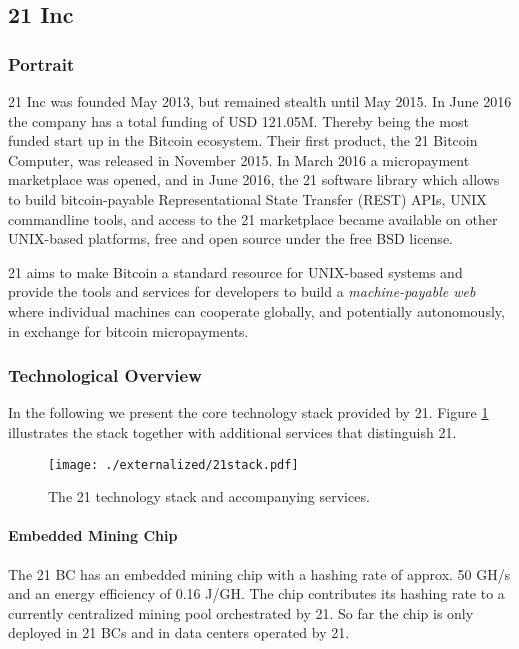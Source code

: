 \subsection{21 Inc}

\subsubsection{Portrait}
21 Inc was founded May 2013, but remained stealth until May 2015. In June 2016 the company has a total funding of USD 121.05M. Thereby being the most funded start up in the Bitcoin ecosystem. Their first product, the 21 Bitcoin Computer, was released in November 2015. In March 2016 a micropayment marketplace was opened, and in June 2016, the 21 software library which allows to build bitcoin-payable Representational State Transfer (REST) APIs, UNIX commandline tools, and access to the 21 marketplace became available on other UNIX-based platforms, free and open source under the free BSD license.

21 aims to make Bitcoin a standard resource for UNIX-based systems and provide the tools and services for developers to build a \emph{machine-payable web} where individual machines can cooperate globally, and potentially autonomously, in exchange for bitcoin micropayments.

\subsubsection{Technological Overview}

In the following we present the core technology stack provided by 21. Figure \ref{fig:21stack} illustrates the stack together with additional services that distinguish 21.

\begin{figure}
\centering
\texttt{[image: ./externalized/21stack.pdf]}
\caption{The 21 technology stack and accompanying services.}
\label{fig:21stack}
\end{figure}

\paragraph{Embedded Mining Chip}

The 21 BC has an embedded mining chip with a hashing rate of approx. 50 GH/s and an energy efficiency of 0.16 J/GH. The chip contributes its hashing rate to a currently centralized mining pool orchestrated by 21. So far the chip is only deployed in 21 BCs and in data centers operated by 21. 	

